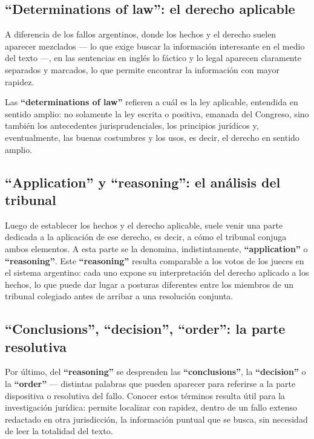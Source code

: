 \documentclass[12pt,oneside]{book}
\begin{document}
\subsection{\texorpdfstring{``Determinations of law'': el derecho aplicable}{Determinations of law: el derecho aplicable}}

A diferencia de los fallos argentinos, donde los hechos y el derecho suelen aparecer mezclados --- lo que exige buscar la información interesante en el medio del texto ---, en las sentencias en inglés lo fáctico y lo legal aparecen claramente separados y marcados, lo que permite encontrar la información con mayor rapidez.

Las \textbf{``determinations of law''} refieren a cuál es la ley aplicable, entendida en sentido amplio: no solamente la ley escrita o positiva, emanada del Congreso, sino también los antecedentes jurisprudenciales, los principios jurídicos y, eventualmente, las buenas costumbres y los usos, es decir, el derecho en sentido amplio.

\subsection{\texorpdfstring{``Application'' y ``reasoning'': el análisis del tribunal}{Application y reasoning: el análisis del tribunal}}

Luego de establecer los hechos y el derecho aplicable, suele venir una parte dedicada a la aplicación de ese derecho, es decir, a cómo el tribunal conjuga ambos elementos. A esta parte se la denomina, indistintamente, \textbf{``application''} o \textbf{``reasoning''}. Este \textbf{``reasoning''} resulta comparable a los votos de los jueces en el sistema argentino: cada uno expone su interpretación del derecho aplicado a los hechos, lo que puede dar lugar a posturas diferentes entre los miembros de un tribunal colegiado antes de arribar a una resolución conjunta.

\subsection{\texorpdfstring{``Conclusions'', ``decision'', ``order'': la parte resolutiva}{Conclusions, decision, order: la parte resolutiva}}

Por último, del \textbf{``reasoning''} se desprenden las \textbf{``conclusions''}, la \textbf{``decision''} o la \textbf{``order''} --- distintas palabras que pueden aparecer para referirse a la parte dispositiva o resolutiva del fallo. Conocer estos términos resulta útil para la investigación jurídica: permite localizar con rapidez, dentro de un fallo extenso redactado en otra jurisdicción, la información puntual que se busca, sin necesidad de leer la totalidad del texto.
\end{document}
